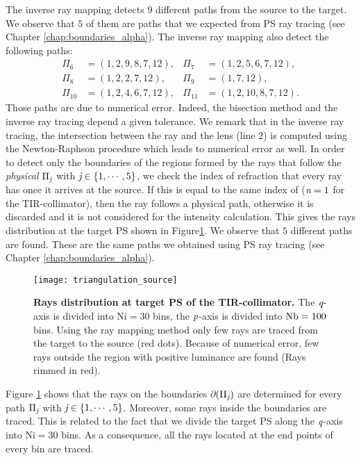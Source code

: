 The inverse ray mapping detects $9$ different paths from the source to the target. 
We observe that $5$ of them are paths that we expected from PS ray tracing (see Chapter \ref{chap:boundaries_alpha}). 
The inverse ray mapping also detect the following paths:
\begin{equation}
\begin{array}{llll}
\Pi_6&=(1,2,9,8,7,12), & \Pi_7&=(1,2,5,6,7,12), \\
\Pi_8&=(1,2,2,7,12),& \Pi_9&=(1,7,12),\\
\Pi_{10}&=(1,2,4,6,7,12),& \Pi_{11}&=(1,2,10,8,7,12).
\end{array}\end{equation}
Those paths are due to numerical error. Indeed, the bisection method and the inverse ray tracing depend a given tolerance. We remark that in the inverse ray tracing, the intersection between the ray and the lens (line $2$) is computed using the Newton-Raphson procedure which leads to numerical error as well.
In order to detect only the boundaries of the regions formed by the rays that follow the \textit{physical} $\Pi_{\textit{j}}$ with $\textit{j}\in\{1, \cdots, 5\}$, we check the index of refraction that every ray has once it arrives at the source.
If this is equal to the same index of  ($\textit{n}=1$ for the TIR-collimator), then the ray follows a physical path, otherwise it is discarded and it is not considered for the intensity calculation. This gives the rays distribution at the target PS shown in Figure\ref{fig:boundaries_TIR_ray_mapping1}. We observe that $5$ different paths are found. These are the same paths we obtained using PS ray tracing (see Chapter \ref{chap:boundaries_alpha}).
\begin{figure}[h]
  \begin{center}
  \texttt{[image: triangulation\_source]}
  \end{center}
  \caption{\textbf{Rays distribution at target PS of the TIR-collimator.}
 The $\textit{q}$-axis is divided into $\textrm{Ni}=30$ bins, the $\textit{p}$-axis is divided into $\textrm{Nb} = 100$ bins. Using the ray mapping method only few rays are traced from the target to the source (red dots). Because of numerical error, few rays outside the region with positive luminance are found (Rays rimmed in red).}
\label{fig:boundaries_TIR_ray_mapping1}
 \end{figure}
Figure \ref{fig:boundaries_TIR_ray_mapping1} shows that the rays on the boundaries $\partial$$(\Pi_{\textit{j}})$ are determined for every path $\Pi_{\textit{j}}$ with $\textit{j}\in\{1, \cdots, 5\}$. Moreover, some rays inside the boundaries are traced. This is related to the fact that we divide the target PS along the $\textit{q}$-axis into $\textrm{Ni}=30$ bins. As a consequence, all the rays located at the end points of every bin are traced. \\
